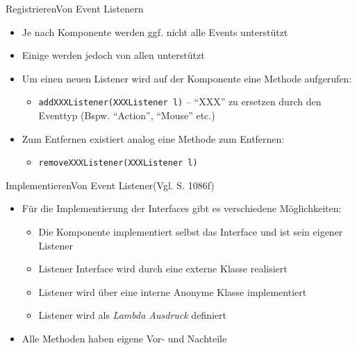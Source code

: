 \begin{frame}{Registrieren}{Von Event Listenern}
    \begin{itemize}
        \item Je nach Komponente werden ggf. nicht alle Events unterstützt
        \item Einige werden jedoch von allen unterstützt
        \item Um einen neuen Listener wird auf der Komponente eine Methode aufgerufen:
        \begin{itemize}
            \item \texttt{addXXXListener(XXXListener l)} -- "`XXX"' zu ersetzen durch den Eventtyp (Bspw. "`Action"', "`Mouse"' etc.)
        \end{itemize}
        \item Zum Entfernen existiert analog eine Methode zum Entfernen:
        \begin{itemize}
            \item \texttt{removeXXXListener(XXXListener l)}
        \end{itemize}
    \end{itemize}
\end{frame}

\begin{frame}{Implementieren}{Von Event Listener(Vgl. \cite{ullenboom2014java} S. 1086f)}
    \begin{itemize}
        \item Für die Implementierung der Interfaces gibt es verschiedene Möglichkeiten:
        \begin{itemize}
            \item Die Komponente implementiert selbst das Interface und ist sein eigener Listener
            \item Listener Interface wird durch eine externe Klasse realisiert
            \item Listener wird über eine interne Anonyme Klasse implementiert
            \item Listener wird als \textit{Lambda Ausdruck} definiert
        \end{itemize}
        \item Alle Methoden haben eigene Vor- und Nachteile
    \end{itemize}
\end{frame}

